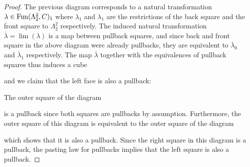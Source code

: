 \begin{lemma}
\begin{proof}
        The previous diagram corresponds to a natural transformation $\lambda\in\operatorname{Fun}(\Lambda_2^2,C)_1$ where $\lambda_1$ and $\lambda_1 $ are the restrictions of the back square and the front square to $\Lambda_2^2$ respectively.
        The induced natural transformation $\overline{\lambda}=\lim(\lambda)$ is a map between pullback squares, and since back and front square in the above diagram were already pullbacks, they are equivalent to $\overline{\lambda}_0$ and $\overline{\lambda}_1$ respectively.
        The map $\overline{\lambda}$ together with the equivalences of pullback squares thus induces a cube
        \begin{center}
        \end{center}
        and we claim that the left face is also a pullback:

        The outer square of the diagram
        \begin{center}
        \end{center}
        is a pullback since both squares are pullbacks by assumption.
        Furthermore, the outer square of this diagram is equivalent to the outer square of the diagram
        \begin{center}
        \end{center}
        which shows that it is also a pullback.
        Since the right square in this diagram is a pullback, the pasting law for pullbacks implies that the left square is also a pullback.


\end{proof}
\end{lemma}
